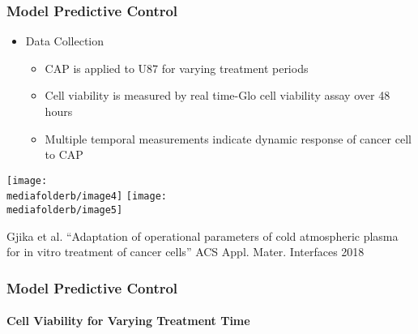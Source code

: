 \documentclass[hyperref={pdftex,pdfpagemode=none,pdfstartview=Fit}]{beamer}
\newcommand{\mediafolderb}{/Users/tylee/Documents/Seminar/Drexel18/Figs/MPC/ppt/media}
\begin{document}
\begin{frame}
    \frametitle{Model Predictive Control}

    \begin{itemize}
        \item Data Collection
            \begin{itemize}
                \item CAP is applied to U87 for varying treatment periods
                \item Cell viability is measured by real time-Glo cell viability assay over 48 hours
                \item Multiple temporal measurements indicate dynamic response of cancer cell to CAP
            \end{itemize}
    \end{itemize}
    \vspace*{0.3cm}
    \centerline{
        \texttt{[image: \\mediafolderb/image4]}
        \hspace*{0.3cm}
        \texttt{[image: \\mediafolderb/image5]}
    }
        \begin{center}
            \scriptsize\selectfont
            Gjika et al. ``Adaptation of operational parameters of cold atmospheric plasma for in vitro treatment of cancer cells'' ACS Appl. Mater. Interfaces 2018
    \end{center}
\end{frame}

\begin{frame}
    \frametitle{Model Predictive Control}
    \framesubtitle{Cell Viability for Varying Treatment Time}



\end{frame}
\end{document}
